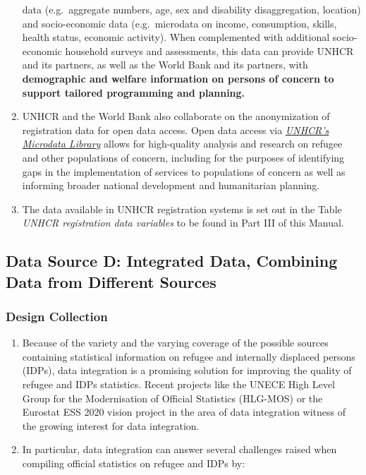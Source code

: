 \documentclass[
]{article}
\begin{document}
\begin{enumerate}
  data (e.g.~aggregate numbers, age, sex and disability
  disaggregation, location) and socio-economic data (e.g.~microdata on
  income, consumption, skills, health status, economic activity). When
  complemented with additional socio-economic household surveys and
  assessments, this data can provide UNHCR and its partners, as well
  as the World Bank and its partners, with \textbf{demographic and welfare
  information on persons of concern to support tailored programming
  and planning.}
\item
  UNHCR and the World Bank also collaborate on the anonymization of
  registration data for open data access. Open data access via
  \href{https://microdata.unhcr.org/index.php/home}{\emph{UNHCR's Microdata
  Library}} allows for
  high-quality analysis and research on refugee and other populations
  of concern, including for the purposes of identifying gaps in the
  implementation of services to populations of concern as well as
  informing broader national development and humanitarian planning.
\item
  The data available in UNHCR registration systems is set out in the
  Table \emph{UNHCR registration data variables} to be found in Part III of
  this Manual.
\end{enumerate}

\hypertarget{data-source-d-integrated-data-combining-data-from-different-sources}{%
\subsection{Data Source D: Integrated Data, Combining Data from Different Sources}\label{data-source-d-integrated-data-combining-data-from-different-sources}}

\hypertarget{design-collection-3}{%
\subsubsection{Design Collection}\label{design-collection-3}}

\begin{enumerate}
\def\labelenumi{\arabic{enumi}.}
\setcounter{enumi}{195}
\item
  Because of the variety and the varying coverage of the possible
  sources containing statistical information on refugee and internally
  displaced persons (IDPs), data integration is a promising solution
  for improving the quality of refugee and IDPs statistics. Recent
  projects like the UNECE High Level Group for the Modernisation of
  Official Statistics (HLG-MOS) or the Eurostat ESS 2020 vision
  project in the area of data integration witness of the growing
  interest for data integration.
\item
  In particular, data integration can answer several challenges
  raised when compiling official statistics on refugee and IDPs by:
\end{enumerate}
\end{document}
